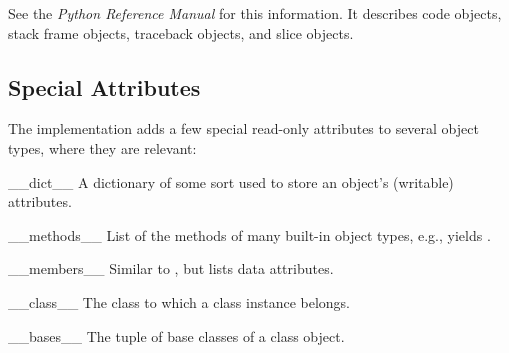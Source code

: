 See the \emph{Python Reference Manual} for this information.  It
describes code objects, stack frame objects, traceback objects, and
slice objects.


\subsection{Special Attributes \label{specialattrs}}

The implementation adds a few special read-only attributes to several
object types, where they are relevant:

\begin{memberdescni}{__dict__}
A dictionary of some sort used to store an
object's (writable) attributes.
\end{memberdescni}

\begin{memberdescni}{__methods__}
List of the methods of many built-in object types,
e.g.,  yields
.
\end{memberdescni}

\begin{memberdescni}{__members__}
Similar to , but lists data attributes.
\end{memberdescni}

\begin{memberdescni}{__class__}
The class to which a class instance belongs.
\end{memberdescni}

\begin{memberdescni}{__bases__}
The tuple of base classes of a class object.
\end{memberdescni}
